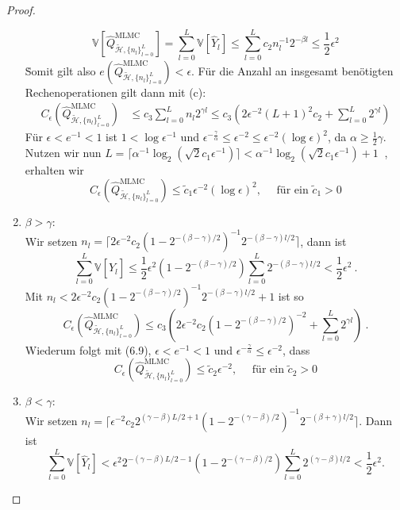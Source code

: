 \begin{proof}
\begin{enumerate}[label=(\roman*)]
		\[
		\mathbb{V}[\widehat{Q}_{\tilde{\mathcal{H}},\{ n_l \}_{l=0}^L }^{\text{MLMC}}] = \sum_{l=0}^{L}\mathbb{V}[\widehat{Y}_l] \leq \sum_{l=0}^{L} c_2 n_l^{-1} 2^{- \beta l} \leq \frac{1}{2} \epsilon^2
		\] \.
		Somit gilt also $ e(\widehat{Q}_{\tilde{\mathcal{H}},\{ n_l \}_{l=0}^L }^{\text{MLMC}}) < \epsilon $.
		Für die Anzahl an insgesamt benötigten Rechenoperationen gilt dann mit (c):
		\begin{align*}
			C_{\epsilon}(\widehat{Q}_{\tilde{\mathcal{H}},\{ n_l \}_{l=0}^L }^{\text{MLMC}})  &\leq c_3 \sum_{l=0}^{L} n_l 2^{\gamma l} 
			\leq c_3 \left( 2 \epsilon^{-2}(L+1)^2 c_2 + \sum_{l=0}^{L} 2^{\gamma l} \right)
		\end{align*}
		Für $ \epsilon < e^{-1} < 1 $ ist $ 1 < \log \epsilon^{-1} $ und $ \epsilon^{- \frac{\gamma}{\alpha}} \leq \epsilon^{-2} \leq \epsilon^{-2}(\log \epsilon)^2$, da $ \alpha \geq \frac{1}{2} \gamma $.
		Nutzen wir nun $ L = \lceil \alpha^{-1} \log_2 (\sqrt{2}c_1\epsilon^{-1}) \rceil < \alpha^{-1} \log_2 (\sqrt{2}c_1\epsilon^{-1}) +1 \ $ , erhalten wir 
		\[
			C_{\epsilon}(\widehat{Q}_{\tilde{\mathcal{H}},\{ n_l \}_{l=0}^L }^{\text{MLMC}}) \leq \tilde{c}_1 \epsilon^{-2} (\log \epsilon )^2 , \quad \text{ für ein }\tilde{c}_1>0
		\]
		\item $ \beta > \gamma \colon $\\
		Wir setzen $ n_l = \lceil 2\epsilon^{-2} c_2 (1-2^{-(\beta-\gamma)/2})^{-1} 2^{-(\beta-\gamma)l/2} \rceil $, dann ist
		\[
		\sum_{l=0}^{L} \mathbb{V}[\widehat{Y}_l] \leq \frac{1}{2}\epsilon^2\left( 1-2^{-(\beta - \gamma)/2} \right) \sum_{l=0}^{L} 2^{-(\beta - \gamma)l/2} < \frac{1}{2} \epsilon^2 \ .
		\]
		Mit $ n_l <  2\epsilon^{-2} c_2 (1-2^{-(\beta-\gamma)/2})^{-1} 2^{-(\beta-\gamma)l/2} +1 $ ist so 
		\[
			C_{\epsilon}(\widehat{Q}_{\tilde{\mathcal{H}},\{ n_l \}_{l=0}^L }^{\text{MLMC}}) \leq c_3 \left( 2\epsilon^{-2}c_2 \left( 1 - 2^{-(\beta-\gamma)/2}\right)^{-2} + \sum_{l=0}^{L}2^{\gamma l} \right) \ .
		\] 
		Wiederum folgt mit (6.9), $ \epsilon < e^{-1} <1 $ und $ \epsilon^{-\frac{\gamma}{\alpha}} \leq \epsilon^{-2} $, dass
		\[
			C_{\epsilon}(\widehat{Q}_{\tilde{\mathcal{H}},\{ n_l \}_{l=0}^L }^{\text{MLMC}}) \leq \tilde{c}_2 \epsilon^{-2}, \quad \text{  für ein }\tilde{c}_2>0
		\]
		\item $ \beta < \gamma \colon $  \\
		Wir setzen $ n_l =  \lceil  \epsilon^{-2} c_2 2^{(\gamma-\beta)L/2+1} \left( 1-2^{-(\gamma - \beta)/2} \right)^{-1} 2^{-(\beta+\gamma)l/2} \rceil $.
		Dann ist 
		\[
		\sum\limits_{l=0}^{L} \mathbb{V}[\widehat{Y}_l] < \epsilon^2 2^{-(\gamma-\beta)L/2 -1}\left( 1- 2^{-(\gamma-\beta)/2} \right) \sum_{l=0}^{L} 2^{(\gamma-\beta)l/2} < \frac{1}{2} \epsilon^2 . 
\]
\end{enumerate}
\end{proof}
